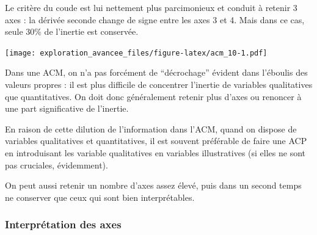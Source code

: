 \documentclass[]{book}
\newenvironment{Shaded}{\begin{snugshade}}{\end{snugshade}}
\newcommand{\DataTypeTok}[1]{\textcolor[rgb]{0.13,0.29,0.53}{#1}}
\newcommand{\DecValTok}[1]{\textcolor[rgb]{0.00,0.00,0.81}{#1}}
\newcommand{\KeywordTok}[1]{\textcolor[rgb]{0.13,0.29,0.53}{\textbf{#1}}}
\newcommand{\NormalTok}[1]{#1}
\newcommand{\OperatorTok}[1]{\textcolor[rgb]{0.81,0.36,0.00}{\textbf{#1}}}
\newcommand{\StringTok}[1]{\textcolor[rgb]{0.31,0.60,0.02}{#1}}
\begin{document}
Le critère du coude est lui nettement plus parcimonieux et conduit à retenir 3 axes : la dérivée seconde change de signe entre les axes 3 et 4. Mais dans ce cas, seule 30\% de l'inertie est conservée.

\begin{Shaded}
\end{Shaded}

\texttt{[image: exploration\_avancee\_files/figure-latex/acm\_10-1.pdf]}

Dans une ACM, on n'a pas forcément de ``décrochage'' évident dans l'éboulis des valeurs propres : il est plus difficile de concentrer l'inertie de variables qualitatives que quantitatives. On doit donc généralement retenir plus d'axes ou renoncer à une part significative de l'inertie.

En raison de cette dilution de l'information dans l'ACM, quand on dispose de variables qualitatives et quantitatives, il est souvent préférable de faire une ACP en introduisant les variable qualitatives en variables illustratives (si elles ne sont pas cruciales, évidemment).

On peut aussi retenir un nombre d'axes assez élevé, puis dans un second temps ne conserver que ceux qui sont bien interprétables.

\hypertarget{interpretation-des-axes-1}{%
\subsubsection{Interprétation des axes}\label{interpretation-des-axes-1}}
\end{document}
